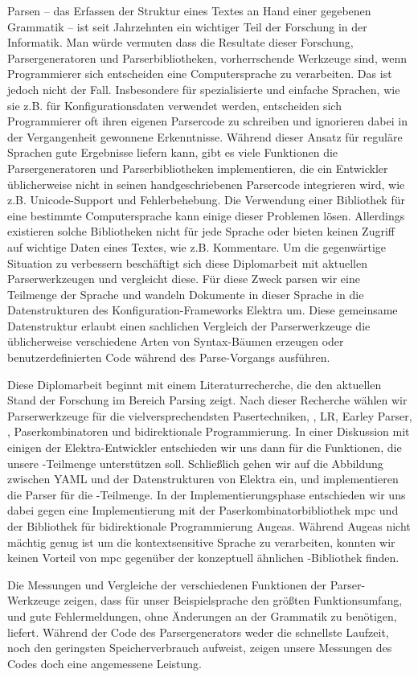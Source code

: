 \begin{kurzfassung}
Parsen – das Erfassen der Struktur eines Textes an Hand einer gegebenen Grammatik – ist seit Jahrzehnten ein wichtiger Teil der Forschung in der Informatik. Man würde vermuten dass die Resultate dieser Forschung, Parsergeneratoren und Parserbibliotheken, vorherrschende Werkzeuge sind, wenn Programmierer sich entscheiden eine Computersprache zu verarbeiten. Das ist jedoch nicht der Fall. Insbesondere für spezialisierte und einfache Sprachen, wie sie z.B. für Konfigurationsdaten verwendet werden, entscheiden sich Programmierer oft ihren eigenen Parsercode zu schreiben und ignorieren dabei in der Vergangenheit gewonnene Erkenntnisse. Während dieser Ansatz für reguläre Sprachen gute Ergebnisse liefern kann, gibt es viele Funktionen die Parsergeneratoren und Parserbibliotheken implementieren, die ein Entwickler üblicherweise nicht in seinen handgeschriebenen Parsercode integrieren wird, wie z.B. Unicode-Support und Fehlerbehebung. Die Verwendung einer Bibliothek für eine bestimmte Computersprache kann einige dieser Problemen lösen. Allerdings existieren solche Bibliotheken nicht für jede Sprache oder bieten keinen Zugriff auf wichtige Daten eines Textes, wie z.B. Kommentare. Um die gegenwärtige Situation zu verbessern beschäftigt sich diese Diplomarbeit mit aktuellen Parserwerkzeugen und vergleicht diese. Für diese Zweck parsen wir eine Teilmenge der Sprache  und wandeln Dokumente in dieser Sprache in die Datenstrukturen des Konfiguration-Frameworks Elektra um. Diese gemeinsame Datenstruktur erlaubt einen sachlichen Vergleich der Parserwerkzeuge die üblicherweise verschiedene Arten von Syntax-Bäumen erzeugen oder benutzerdefinierten Code während des Parse-Vorgangs ausführen.

Diese Diplomarbeit beginnt mit einem Literaturrecherche, die den aktuellen Stand der Forschung im Bereich Parsing zeigt. Nach dieser Recherche wählen wir Parserwerkzeuge für die vielversprechendsten Pasertechniken, , LR, Earley Parser, , Paserkombinatoren und bidirektionale Programmierung. In einer Diskussion mit einigen der Elektra-Entwickler entschieden wir uns dann für die Funktionen, die unsere -Teilmenge unterstützen soll. Schließlich gehen wir auf die Abbildung zwischen YAML und der Datenstrukturen von Elektra ein, und implementieren die Parser für die -Teilmenge. In der Implementierungsphase entschieden wir uns dabei gegen eine Implementierung mit der Paserkombinatorbibliothek mpc und der Bibliothek für bidirektionale Programmierung Augeas. Während Augeas nicht mächtig genug ist um die kontextsensitive Sprache  zu verarbeiten, konnten wir keinen Vorteil von mpc gegenüber der konzeptuell ähnlichen -Bibliothek  finden.

Die Messungen und Vergleiche der verschiedenen Funktionen der Parser-Werkzeuge zeigen, dass für unser Beispielsprache  den größten Funktionsumfang, und gute Fehlermeldungen, ohne Änderungen an der Grammatik zu benötigen, liefert. Während der Code des Parsergenerators weder die schnellste Laufzeit, noch den geringsten Speicherverbrauch aufweist, zeigen unsere Messungen des Codes doch eine angemessene Leistung.
\end{kurzfassung}

